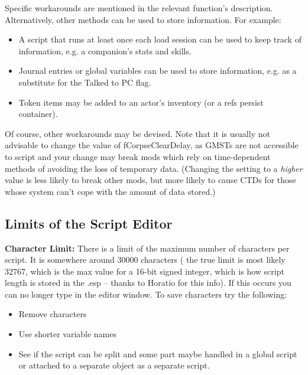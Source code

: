 \documentclass[
]{article}
\begin{document}
Specific workarounds are mentioned in the relevant function's
description. Alternatively, other methods can be used to store
information. For example:

\begin{itemize}
\item
  A script that runs at least once each load session can be used to keep
  track of information, e.g. a companion's stats and skills.
\item
  Journal entries or global variables can be used to store information,
  e.g. as a substitute for the Talked to PC flag.
\item
  Token items may be added to an actor's inventory (or a refs persist
  container).
\end{itemize}

Of course, other workarounds may be devised. Note that it is usually not
advisable to change the value of fCorpseClearDelay, as GMSTs are not
accessible to script and your change may break mods which rely on
time-dependent methods of avoiding the loss of temporary data. (Changing
the setting to a \emph{higher} value is less likely to break other mods,
but more likely to cause CTDs for those whose system can't cope with the
amount of data stored.)

\hypertarget{limits-of-the-script-editor}{%
\subsection{Limits of the Script
Editor}\label{limits-of-the-script-editor}}

\textbf{Character Limit:} There is a limit of the maximum number of
characters per script. It is somewhere around 30000 characters ( the
true limit is most likely 32767, which is the max value for a 16-bit
signed integer, which is how script length is stored in the .esp --
thanks to Horatio for this info). If this occurs you can no longer type
in the editor window. To save characters try the following:

\begin{itemize}
\item
  Remove characters
\end{itemize}

\begin{itemize}
\item
  Use shorter variable names
\item
  See if the script can be split and some part maybe handled in a global
  script or attached to a separate object as a separate script.
\end{itemize}
\end{document}
